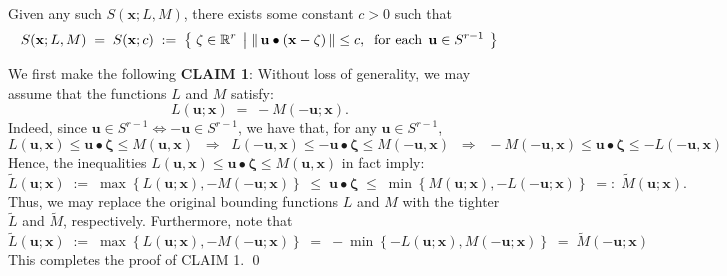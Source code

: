 \begin{proposition}\quad
Given any such $S(\mathbf{x};L,M)$, there exists some constant $c > 0$ such that
\begin{equation*}
S(\mathbf{x};L,M) \; = \; S(\mathbf{x};c) \; := \;
\left\{\;
\zeta \in \Re^{r}
\;\left\vert\;
\Vert\,\mathbf{u} \bullet (\mathbf{x} - \mathbf{\zeta})\,\Vert
\leq c,
\;\;
\textnormal{for each}\;\, \mathbf{u} \in S^{r-1}
\right.
\;\right\}
\end{equation*}
\end{proposition}
\proof
We first make the following
\vskip 0.5cm
\noindent
\textbf{CLAIM 1}: Without loss of generality, we may assume that the functions $L$ and $M$ satisfy:
\begin{equation*}
L(\mathbf{u};\mathbf{x}) \; = \; -M(-\mathbf{u};\mathbf{x}).
\end{equation*}
Indeed, since $\mathbf{u} \in S^{r-1} \Longleftrightarrow -\mathbf{u} \in S^{r-1}$, we have that,
for any $\mathbf{u} \in S^{r-1}$,
\begin{equation*}
L(\mathbf{u},\mathbf{x}) \leq \mathbf{u} \bullet \mathbf{\zeta} \leq M(\mathbf{u},\mathbf{x})
\;\;\Longrightarrow\;\;
L(-\mathbf{u},\mathbf{x}) \leq -\mathbf{u} \bullet \mathbf{\zeta} \leq M(-\mathbf{u},\mathbf{x})
\;\;\Longrightarrow\;\;
-M(-\mathbf{u},\mathbf{x}) \leq \mathbf{u} \bullet \mathbf{\zeta} \leq -L(-\mathbf{u},\mathbf{x})
\end{equation*}
Hence, the inequalities
$L(\mathbf{u},\mathbf{x}) \leq \mathbf{u} \bullet \mathbf{\zeta} \leq M(\mathbf{u},\mathbf{x})$
in fact imply:
\begin{equation*}
\widetilde{L}(\mathbf{u};\mathbf{x}) \; := \;\max\left\{L(\mathbf{u};\mathbf{x}),-M(-\mathbf{u};\mathbf{x})\right\}
\; \leq \; \mathbf{u} \bullet \mathbf{\zeta} \; \leq \;
\min\left\{M(\mathbf{u};\mathbf{x}),-L(-\mathbf{u};\mathbf{x})\right\} \; =: \; \widetilde{M}(\mathbf{u};\mathbf{x}).
\end{equation*}
Thus, we may replace the original bounding functions $L$ and $M$ with the tighter
$\widetilde{L}$ and $\widetilde{M}$, respectively.  Furthermore, note that
\begin{equation*}
\widetilde{L}(\mathbf{u};\mathbf{x})
\; := \;
\max\left\{ L(\mathbf{u};\mathbf{x}),-M(-\mathbf{u};\mathbf{x}) \right\}
\;  = \;
- \min\left\{ -L(\mathbf{u};\mathbf{x}),M(-\mathbf{u};\mathbf{x}) \right\}
\;  = \;
\widetilde{M}(-\mathbf{u};\mathbf{x})
\end{equation*}
This completes the proof of CLAIM 1.
\qed
